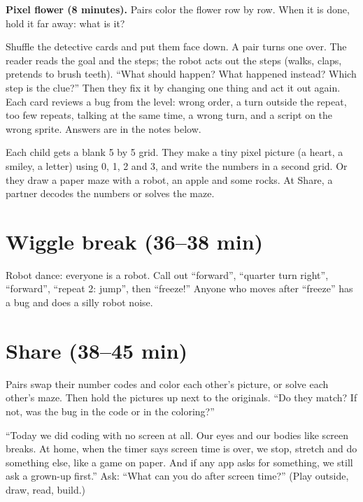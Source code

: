 \textbf{Pixel flower (8 minutes).} Pairs color the flower row by row. When it is done, hold it far away: what is it?

\begin{bughunt}
Shuffle the detective cards and put them face down. A pair turns one over. The reader reads the goal and the steps; the robot acts out the steps (walks, claps, pretends to brush teeth). \enquote{What should happen? What happened instead? Which step is the clue?} Then they fix it by changing one thing and act it out again. Each card reviews a bug from the level: wrong order, a turn outside the repeat, too few repeats, talking at the same time, a wrong turn, and a script on the wrong sprite. Answers are in the notes below.
\end{bughunt}

\begin{freebuild}
Each child gets a blank 5 by 5 grid. They make a tiny pixel picture (a heart, a smiley, a letter) using 0, 1, 2 and 3, and write the numbers in a second grid. Or they draw a paper maze with a robot, an apple and some rocks. At Share, a partner decodes the numbers or solves the maze.
\end{freebuild}

\section{Wiggle break (36--38 min)}
Robot dance: everyone is a robot. Call out \enquote{forward}, \enquote{quarter turn right}, \enquote{forward}, \enquote{repeat 2: jump}, then \enquote{freeze!} Anyone who moves after \enquote{freeze} has a bug and does a silly robot noise.

\section{Share (38--45 min)}
\begin{teacherscript}
Pairs swap their number codes and color each other's picture, or solve each other's maze. Then hold the pictures up next to the originals. \enquote{Do they match? If not, was the bug in the code or in the coloring?}
\end{teacherscript}

\begin{safety}
\enquote{Today we did coding with no screen at all. Our eyes and our bodies like screen breaks. At home, when the timer says screen time is over, we stop, stretch and do something else, like a game on paper. And if any app asks for something, we still ask a grown-up first.} Ask: \enquote{What can you do after screen time?} (Play outside, draw, read, build.)
\end{safety}

